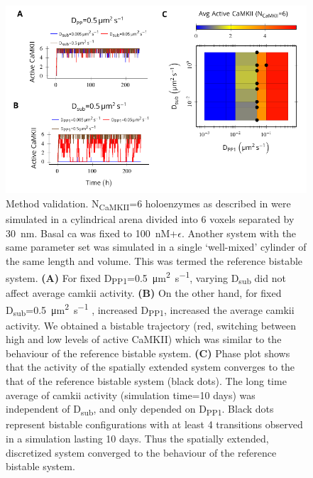 \documentclass[9pt,lineno,doublespacing]{elife}
\newcommand\SUB[2]{#1\textsubscript{#2}}
\begin{document}
\begin{figure}[ht!]
    \includegraphics[width=12cm]{./PaperFigures/elifeFigure7/figure_su_long_term_effect.pdf}
    \caption{Method validation. \SUB{N}{CaMKII}=6 holoenzymes as described in
         were simulated in a cylindrical arena divided
        into 6 voxels separated by \SI{30}{\nano\meter}. Basal \gls{ca} 
        was fixed to \SI{100}{\nano M}+$\epsilon$. Another system with the same
        parameter set was simulated in a single `well-mixed' cylinder of 
        the same length and volume. This was termed the reference bistable 
		system. 
        \textbf{(A)} For fixed \SUB{D}{PP1}=\SI{0.5}{\micro\meter\squared\per\second}, varying
        \SUB{D}{sub} did not affect average \gls{camkii} activity. 
        \textbf{(B)} On the other hand, for fixed
        \SUB{D}{sub}=\SI{0.5}{\micro\meter\squared\per\second} , increased
        \SUB{D}{PP1}, increased the average \gls{camkii} activity. We obtained a bistable
        trajectory (red, switching between high and low levels of active CaMKII) which was similar to the behaviour of the reference bistable
        system. \textbf{(C)} Phase plot shows that the activity of the 
		spatially extended 
        system converges to the that of the reference bistable system 
		(black dots). The long time
        average of \Gls{camkii} activity (simulation time=10 days) was independent of 
        \SUB{D}{sub}, and only depended on \SUB{D}{PP1}. Black dots represent bistable
        configurations with at least 4 transitions observed in a simulation 
		lasting 10 days. Thus the spatially extended, discretized system converged to the behaviour of the reference bistable system.
    }\label{fig:method_validation} 


\end{figure}
\end{document}
